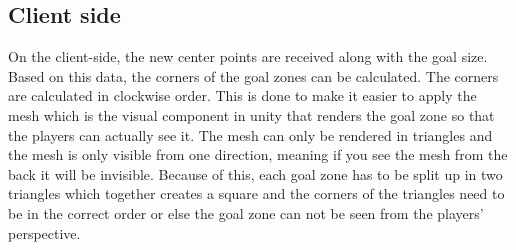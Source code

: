 \subsection{Client side}
On the client-side, the new center points are received along with the goal size.
Based on this data, the corners of the goal zones can be calculated.
The corners are calculated in clockwise order.
This is done to make it easier to apply the mesh which is the visual component in unity that renders the goal zone so that the players can actually see it.
The mesh can only be rendered in triangles and the mesh is only visible from one direction, meaning if you see the mesh from the back it will be invisible.
Because of this, each goal zone has to be split up in two triangles which together creates a square and the corners of the triangles need to be in the correct order or else the goal zone can not be seen from the players' perspective.
